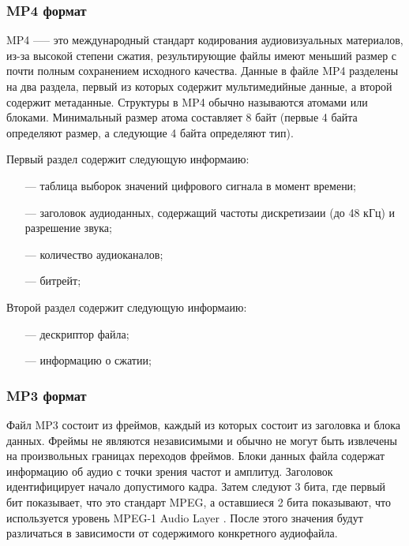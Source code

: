 	\subsubsection{MP4 формат}
		\par MP4 \cite{mp4} —-- это международный стандарт кодирования аудиовизуальных материалов, 
		из-за высокой степени сжатия, результирующие файлы имеют меньший размер с почти полным сохранением исходного качества.
		Данные в файле MP4 разделены на два раздела, первый из которых содержит мультимедийные данные, а второй содержит метаданные.
		Структуры в MP4 обычно называются атомами или блоками. Минимальный размер атома составляет 8 байт (первые 4 байта определяют размер, а следующие 4 байта определяют тип).

		\par Первый раздел содержит следующую информаию:
		\begin{itemize}
			\item[---] таблица выборок значений цифрового сигнала в момент времени;
			\item[---] заголовок аудиоданных, содержащий частоты дискретизаии (до 48 кГц) и разрешение звука;
			\item[---] количество аудиоканалов;
			\item[---] битрейт;
		\end{itemize}

		\par Второй раздел содержит следующую информаию:
		\begin{itemize}
			\item[---] дескриптор файла;
			\item[---] информацию о сжатии;
		\end{itemize}

	
	\subsubsection{MP3 формат}
		\par Файл MP3 \cite{mp3} состоит из фреймов, каждый из которых состоит из заголовка и блока данных. 
		Фреймы не являются независимыми и обычно не могут быть извлечены на произвольных границах переходов фреймов. 
		Блоки данных файла содержат информацию об аудио с точки зрения частот и амплитуд. 
		Заголовок идентифицирует начало допустимого кадра. 
		Затем следуют 3 бита, где первый бит показывает, что это стандарт MPEG, а оставшиеся 2 бита показывают, что используется уровень MPEG-1 Audio Layer \cite{mpeg}. 
		После этого значения будут различаться в зависимости от содержимого конкретного аудиофайла.

